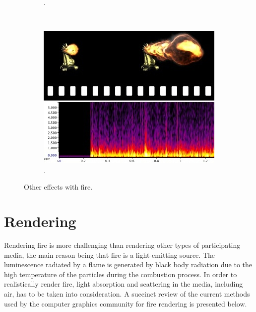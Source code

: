 \begin{figure}[htb!]
\begin{subfigure}[t]{0.4\textwidth}
                \caption{\cite{Melek:2005}.}
        \end{subfigure}  
        ~ %
        \begin{subfigure}[t]{0.3\textwidth}
                \includegraphics[width=\textwidth]{img/chadwick_2011}
                \caption{\cite{Chadwick:2011}.}
        \end{subfigure}          
        \caption{Other effects with fire.}
        \label{fig:other_effects}
\end{figure}



\section{Rendering}
\label{sec:rendering}

Rendering fire is more challenging than rendering other types of participating media, the main reason being that fire is a light-emitting source.
The luminescence radiated by a flame is generated by black body radiation due to the high temperature of the particles during the combustion process.
In order to realistically render fire, light absorption and scattering in the media, including air, has to be taken into consideration.
A succinct review of the current methods used by the computer graphics community for fire rendering is presented below.

